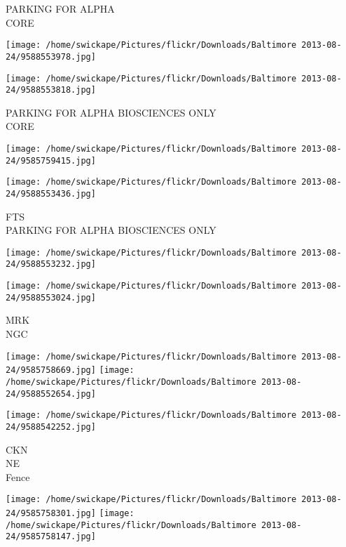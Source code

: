 \documentclass[10pt,letterpaper]{article}
\begin{document}
PARKING FOR ALPHA\\
CORE\\
\pagebreak

\texttt{[image: /home/swickape/Pictures/flickr/Downloads/Baltimore 2013-08-24/9588553978.jpg]}

\vspace{0.25in}
\texttt{[image: /home/swickape/Pictures/flickr/Downloads/Baltimore 2013-08-24/9588553818.jpg]}

PARKING FOR ALPHA BIOSCIENCES ONLY\\
CORE\\
\pagebreak

\texttt{[image: /home/swickape/Pictures/flickr/Downloads/Baltimore 2013-08-24/9585759415.jpg]}

\vspace{0.25in}
\texttt{[image: /home/swickape/Pictures/flickr/Downloads/Baltimore 2013-08-24/9588553436.jpg]}

FTS\\
PARKING FOR ALPHA BIOSCIENCES ONLY\\
\pagebreak

\texttt{[image: /home/swickape/Pictures/flickr/Downloads/Baltimore 2013-08-24/9588553232.jpg]}

\vspace{0.25in}
\texttt{[image: /home/swickape/Pictures/flickr/Downloads/Baltimore 2013-08-24/9588553024.jpg]}

MRK\\
NGC\\
\pagebreak

\texttt{[image: /home/swickape/Pictures/flickr/Downloads/Baltimore 2013-08-24/9585758669.jpg]}
\texttt{[image: /home/swickape/Pictures/flickr/Downloads/Baltimore 2013-08-24/9588552654.jpg]}

\vspace{0.25in}
\texttt{[image: /home/swickape/Pictures/flickr/Downloads/Baltimore 2013-08-24/9588542252.jpg]}

CKN\\
NE\\
Fence\\
\pagebreak

\texttt{[image: /home/swickape/Pictures/flickr/Downloads/Baltimore 2013-08-24/9585758301.jpg]}
\texttt{[image: /home/swickape/Pictures/flickr/Downloads/Baltimore 2013-08-24/9585758147.jpg]}
\end{document}
